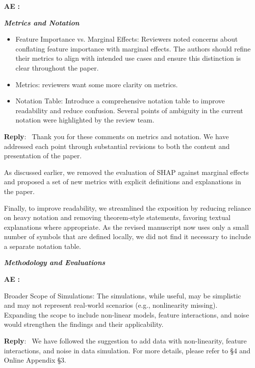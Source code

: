 \documentclass[11pt]{article}
\newcounter{se}[section]
\newcounter{aed}[section]
\newenvironment{aed}[1][]{%
    \refstepcounter{aed}\par\medskip\noindent%
    \textbf{AE \theaed: #1}\rmfamily\itshape%
}{\medskip}
\newenvironment{aed*}[1][]{%
    \par\medskip%
    \rmfamily\itshape%
}{\medskip}
\newcounter{reviewer}
\newcounter{point}[reviewer]
\newenvironment{reply}
 {\par\medskip \noindent \begin{sf}\textbf{Reply}:\ }
 {\medskip \end{sf}}
\begin{document}
    \begin{aed}
    \textbf{\textit{Metrics and Notation}}
    \begin{itemize}
        \item         Feature Importance vs. Marginal Effects: Reviewers noted concerns about conflating feature importance with marginal effects. The authors should refine their metrics to align with intended use cases and ensure this distinction is clear throughout the paper.
        \item     Metrics: reviewers want some more clarity on metrics.
\item     Notation Table: Introduce a comprehensive notation table to improve readability and reduce confusion. Several points of ambiguity in the current notation were highlighted by the review team.
    \end{itemize}

    \end{aed}

\begin{reply}
Thank you for these comments on metrics and notation. We have addressed each point through substantial revisions to both the content and presentation of the paper.

As discussed earlier, we removed the evaluation of SHAP against marginal effects and proposed a set of new  metrics with explicit definitions and explanations in the paper.

Finally, to improve readability, we streamlined the exposition by reducing reliance on heavy notation and removing theorem-style statements, favoring textual explanations where appropriate. As the revised manuscript now uses only a small number of symbols that are defined locally, we did not find it necessary to include a separate notation table.
\end{reply}



\begin{aed*}
\textbf{\textit{Methodology and Evaluations}}
\end{aed*}
\begin{aed}
    Broader Scope of Simulations: The simulations, while useful, may be simplistic and may not represent real-world scenarios (e.g., nonlinearity missing). Expanding the scope to include non-linear models, feature interactions, and noise would strengthen the findings and their applicability.
\end{aed}

\begin{reply}
    We have followed the suggestion to add data with non-linearity, feature interactions, and noise in data simulation. For more details, please refer to \S 4 and Online Appendix \S 3.
\end{reply}
\end{document}
